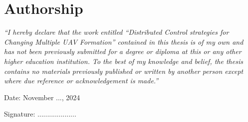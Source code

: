 \chapter*{Authorship}
\textit{``I hereby declare that the work entitled ``Distributed Control strategies for Changing Multiple UAV Formation'' contained in this thesis is of my own and has not been previously submitted for a degree or diploma at this or any other higher education institution. To the best of my knowledge and belief, the thesis contains no materials previously published or written by another person except where due reference or acknowledgement is made.''
}
\vspace{0.5cm}

\begin{flushleft}
    Date: November ..., 2024\quad\par

    \vspace{0.5cm}
    
    Signature: ....................
\end{flushleft}
